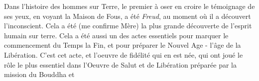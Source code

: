 Dans l'histoire des hommes sur Terre, le premier à oser en croire le témoignage de ses yeux, en voyant la Maison de Fous, a été \textit{Freud}, au moment où il a découvert l'inconscient. Cela a été (me confirme Mère) la plus grande découverte de l'esprit humain sur terre. Cela a été aussi un des actes essentiels pour marquer le commencement du Temps  la Fin, et pour préparer le Nouvel Age - l'âge de la Libération. C'est cet acte, et l'oeuvre de fidélité qui en est née, qui ont joué le rôle le plus essentiel dans l'Oeuvre de Salut et de Libération préparée par la mission du Bouddha et
